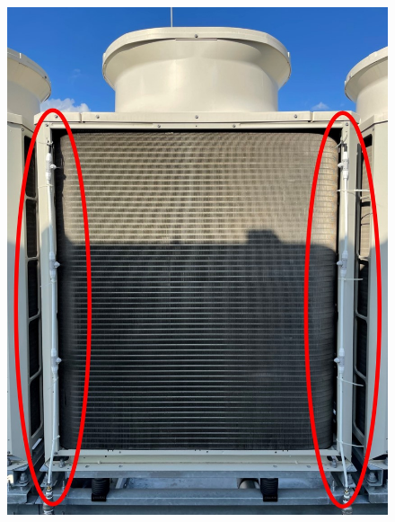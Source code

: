 \documentclass[a4j,fleqn,dvipdfmx,uplatex]{jsarticle}
\begin{document}
\begin{figure}[htb]
  \centering
    \begin{minipage}[b]{0.45\linewidth}
      \centering
      \includegraphics[width=\linewidth]{img/IMG_0146.jpg}
    \end{minipage}
    \begin{minipage}[b]{0.45\linewidth}
      \centering

\end{minipage}
\end{figure}
\end{document}
